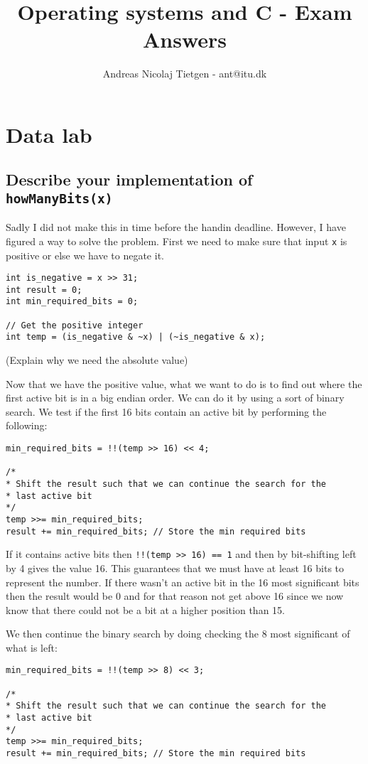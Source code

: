 \documentclass[11pt]{article}
\title{Operating systems and C - Exam Answers}
\author{Andreas Nicolaj Tietgen - ant@itu.dk}
\newcommand{\code}[1]{{\colorbox{lightgray!15}{\color{orange}\texttt{#1}}}}
\newcommand{\temp}[1]{{\color{red}#1}}
\begin{document}
\maketitle

\section{Data lab}

\subsection{Describe your implementation of \code{howManyBits(x)}}
Sadly I did not make this in time before the handin deadline. However, I have figured a way to 
solve the problem. First we need to make sure that input \code{x} is positive or else we have to negate it.

\begin{lstlisting}
int is_negative = x >> 31;
int result = 0;
int min_required_bits = 0;

// Get the positive integer
int temp = (is_negative & ~x) | (~is_negative & x); 
\end{lstlisting}
\temp{(Explain why we need the absolute value)}

Now that we have the positive value, what we want to do is to find out where the first active bit is in a big endian order.
We can do it by using a sort of binary search. We test if the first 16 bits contain an active bit by performing
the following:

\begin{lstlisting}
min_required_bits = !!(temp >> 16) << 4;

/* 
* Shift the result such that we can continue the search for the 
* last active bit 
*/
temp >>= min_required_bits;
result += min_required_bits; // Store the min required bits
\end{lstlisting}

If it contains active bits then \code{!!(temp >> 16) == 1} and then by bit-shifting left by 4 
gives the value 16. This guarantees that we must have at least 16 bits to represent the number. 
If there wasn't an active bit in the 16 most significant bits then the result would be 0 and for 
that reason not get above 16 since we now know that there could not be a bit at a higher position than 15.

We then continue the binary search by doing checking the 8 most significant of what is left:

\begin{lstlisting}
min_required_bits = !!(temp >> 8) << 3;

/* 
* Shift the result such that we can continue the search for the 
* last active bit 
*/
temp >>= min_required_bits;
result += min_required_bits; // Store the min required bits
\end{lstlisting}
\end{document}

